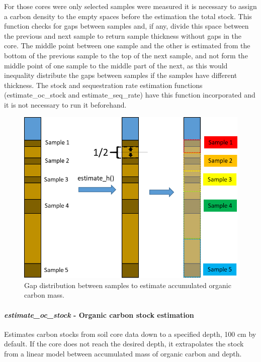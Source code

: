 \documentclass[10pt,a4paper,onecolumn]{article}
\let\oldparagraph\paragraph
\renewcommand{\paragraph}[1]{\oldparagraph{#1}\mbox{}}
\begin{document}
For those cores were only selected samples were measured it is necessary
to assign a carbon density to the empty spaces before the estimation the
total stock. This function checks for gaps between samples and, if any,
divide this space between the previous and next sample to return sample
thickness without gaps in the core. The middle point between one sample
and the other is estimated from the bottom of the previous sample to the
top of the next sample, and not form the middle point of one sample to
the middle part of the next, as this would inequality distribute the
gaps between samples if the samples have different thickness. The stock
and sequestration rate estimation functions (estimate\_oc\_stock and
estimate\_seq\_rate) have this function incorporated and it is not
necessary to run it beforehand.

\begin{figure}
\centering
\includegraphics[width=4.97917in,height=\textheight]{images/estimate_h().png}
\caption{Gap distribution between samples to estimate accumulated
organic carbon mass.}
\end{figure}

\hypertarget{estimate_oc_stock---organic-carbon-stock-estimation}{%
\paragraph{\texorpdfstring{\textbf{\emph{estimate\_oc\_stock}} \textbf{-
Organic carbon stock
estimation}}{estimate\_oc\_stock - Organic carbon stock estimation}}\label{estimate_oc_stock---organic-carbon-stock-estimation}}

Estimates carbon stocks from soil core data down to a specified depth,
100 cm by default. If the core does not reach the desired depth, it
extrapolates the stock from a linear model between accumulated mass of
organic carbon and depth.
\end{document}
